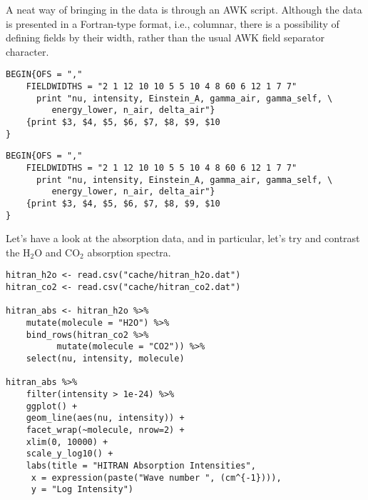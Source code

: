 \documentclass[10pt,a4paper,titlepage]{article}
\begin{document}
A neat way of bringing in the data is through an AWK script. Although
the data is presented in a Fortran-type format, i.e., columnar, there
is a possibility of defining fields by their width, rather than the
usual AWK field separator character.

\begin{lstlisting}
BEGIN{OFS = ","
    FIELDWIDTHS = "2 1 12 10 10 5 5 10 4 8 60 6 12 1 7 7"
      print "nu, intensity, Einstein_A, gamma_air, gamma_self, \
	     energy_lower, n_air, delta_air"}
    {print $3, $4, $5, $6, $7, $8, $9, $10
}
\end{lstlisting}

\begin{lstlisting}
BEGIN{OFS = ","
    FIELDWIDTHS = "2 1 12 10 10 5 5 10 4 8 60 6 12 1 7 7"
      print "nu, intensity, Einstein_A, gamma_air, gamma_self, \
	     energy_lower, n_air, delta_air"}
    {print $3, $4, $5, $6, $7, $8, $9, $10
}
\end{lstlisting}

Let's have a look at the absorption data, and in particular, let's try
and contrast the H$_{\text{2}}$O and CO$_{\text{2}}$ absorption spectra.

\begin{lstlisting}
hitran_h2o <- read.csv("cache/hitran_h2o.dat")
hitran_co2 <- read.csv("cache/hitran_co2.dat")

hitran_abs <- hitran_h2o %>%
    mutate(molecule = "H2O") %>%
    bind_rows(hitran_co2 %>%
	      mutate(molecule = "CO2")) %>%
    select(nu, intensity, molecule)

hitran_abs %>%
    filter(intensity > 1e-24) %>%
    ggplot() +
    geom_line(aes(nu, intensity)) +
    facet_wrap(~molecule, nrow=2) +
    xlim(0, 10000) +
    scale_y_log10() +
    labs(title = "HITRAN Absorption Intensities",
	 x = expression(paste("Wave number ", (cm^{-1}))),
	 y = "Log Intensity")
\end{lstlisting}
\end{document}
